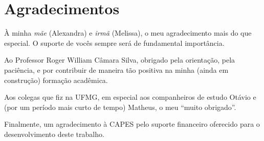 \newpage

\section*{\Large \hspace*{\fill} \textbf{Agradecimentos} \hspace*{\fill}}

À minha \textit{mãe} (Alexandra) e \textit{irmã} (Melissa), o meu agradecimento mais do que especial. O suporte de vocês sempre será de fundamental importância.

Ao Professor Roger William Câmara Silva, obrigado pela orientação, pela paciência, e por contribuir de maneira tão positiva na minha (ainda em construção) formação acadêmica.

Aos colegas que fiz na UFMG, em especial aos companheiros de estudo Otávio e (por um período mais curto de tempo) Matheus, o meu ``muito obrigado''. 

Finalmente, um agradecimento à CAPES pelo suporte financeiro oferecido para o desenvolvimento deste trabalho.